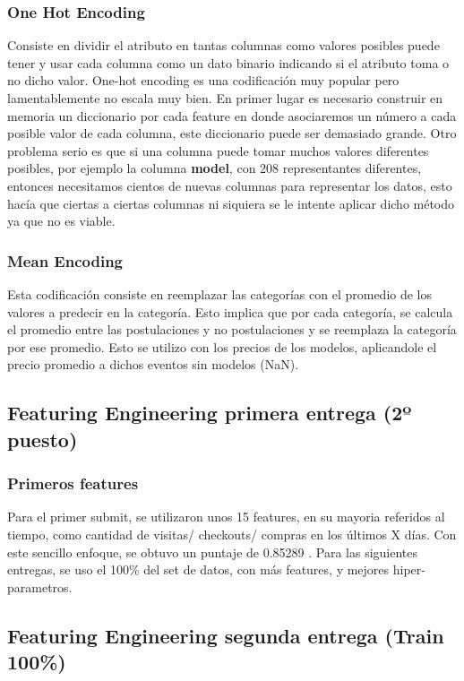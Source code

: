 \documentclass[a4paper ,12pt]{article}
\begin{document}
\subsubsection{One Hot Encoding}

Consiste en dividir el atributo en tantas columnas como valores posibles puede tener y usar cada columna como un dato binario indicando si el atributo toma o no dicho
valor. One-hot encoding es una codificación muy popular pero lamentablemente
no escala muy bien. En primer lugar es necesario construir en memoria un
diccionario por cada feature en donde asociaremos un número a cada posible
valor de cada columna, este diccionario puede ser demasiado grande. Otro
problema serio es que si una columna puede tomar muchos valores diferentes
posibles, por ejemplo la columna \textbf{model}, con $208$ representantes diferentes, entonces necesitamos cientos de nuevas columnas para representar los datos, esto hacía que ciertas a ciertas columnas ni siquiera se le intente aplicar dicho método ya que no es viable.


\subsubsection{Mean Encoding}
Esta codificación consiste en reemplazar las categorías con el
promedio de los valores a predecir en la categoría. Esto implica que por cada categoría, se calcula el promedio entre las postulaciones y no postulaciones y se
reemplaza la categoría por ese promedio. Esto se utilizo con los precios de los modelos, aplicandole el precio promedio a dichos eventos sin modelos (NaN).

\subsection{Featuring Engineering primera entrega (2º puesto)}

\subsubsection{Primeros features}
Para el primer submit, se utilizaron unos 15 features, en su mayoria referidos al tiempo, como cantidad de visitas/ checkouts/ compras en los últimos X días. Con este sencillo enfoque, se obtuvo un puntaje de 0.85289 . Para las siguientes entregas, se uso el 100\% del set de datos, con más features, y mejores hiper-parametros. 

\subsection{Featuring Engineering segunda entrega (Train 100\%)}
\end{document}
